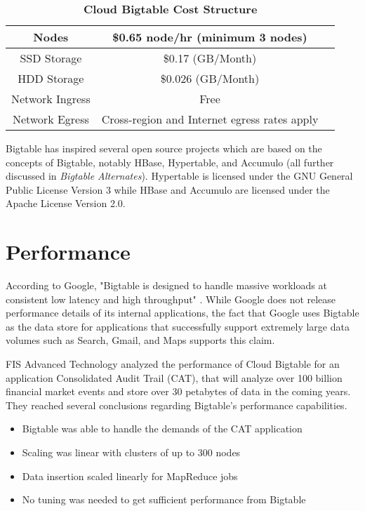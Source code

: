 \documentclass[9pt,twocolumn,twoside]{../../styles/osajnl}
\begin{document}
\begin{table}[htbp]
\centering
\caption{\bf Cloud Bigtable Cost Structure \cite{www-cloudbigtable}}

 \begin{tabular} {| c | c | c |}

 \hline
Nodes     &    \$0.65 node/hr (minimum 3 nodes) \\
 \hline
SSD Storage     &    \$0.17 (GB/Month)  \\
 \hline
HDD Storage & \$0.026 (GB/Month) \\
 \hline
Network Ingress & Free \\
 \hline
Network Egress & Cross-region and Internet egress rates apply \\
 \hline

\end{tabular}
  \label{tab:bigtable-pricing}
\end{table}

Bigtable has inspired several open source projects which are based on the concepts of Bigtable, notably HBase, Hypertable, and Accumulo (all further discussed in \emph{Bigtable Alternates}). Hypertable is licensed under the GNU General Public License Version 3 while HBase and Accumulo are licensed under the Apache License Version 2.0.


\section{Performance}

According to Google, "Bigtable is designed to handle massive workloads at consistent low latency and high throughput" \cite{www-cloudbigtable}.  While Google does not release performance details of its internal applications, the fact that Google uses Bigtable as the data store for applications that successfully support extremely large data volumes such as Search, Gmail, and Maps supports this claim.

FIS Advanced Technology analyzed the performance of Cloud Bigtable for an application Consolidated Audit Trail (CAT), that will analyze over 100 billion financial market events and store over 30 petabytes of data in the coming years.  They reached several conclusions regarding Bigtable's performance capabilities.
\begin{itemize}
\item Bigtable was able to handle the demands of the CAT application 
\item Scaling was linear with clusters of up to 300 nodes 
\item Data insertion scaled linearly for MapReduce jobs 
\item No tuning was needed to get sufficient performance from Bigtable
\end{itemize}
\end{document}
